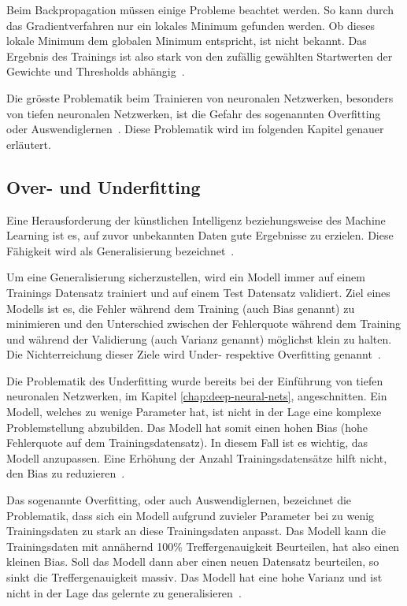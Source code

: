 Beim Backpropagation müssen einige Probleme beachtet werden. So kann durch das Gradientverfahren nur ein lokales Minimum gefunden werden. Ob dieses lokale Minimum dem globalen Minimum entspricht, ist nicht bekannt. Das Ergebnis des Trainings ist also stark von den zufällig gewählten Startwerten der Gewichte und Thresholds abhängig~\autocite{Krogh2008}.

Die grösste Problematik beim Trainieren von neuronalen Netzwerken, besonders von tiefen neuronalen Netzwerken, ist die Gefahr des sogenannten Overfitting oder Auswendiglernen~\autocite{Krogh2008}. Diese Problematik wird im folgenden Kapitel genauer erläutert.

\subsection{Over- und Underfitting}
\label{chap:overfitting}

Eine Herausforderung der künstlichen Intelligenz beziehungsweise des Machine Learning ist es, auf zuvor unbekannten Daten gute Ergebnisse zu erzielen. Diese Fähigkeit wird als Generalisierung bezeichnet~\autocite{Goodfellow2016}.

Um eine Generalisierung sicherzustellen, wird ein Modell immer auf einem Trainings Datensatz trainiert und auf einem Test Datensatz validiert. Ziel eines Modells ist es, die Fehler während dem Training (auch Bias genannt) zu minimieren und den Unterschied zwischen der Fehlerquote während dem Training und während der Validierung (auch Varianz genannt) möglichst klein zu halten. Die Nichterreichung dieser Ziele wird Under- respektive Overfitting genannt~\autocite{Goodfellow2016}.

Die Problematik des Underfitting wurde bereits bei der Einführung von tiefen neuronalen Netzwerken, im Kapitel \ref{chap:deep-neural-nets}, angeschnitten. Ein Modell, welches zu wenige Parameter hat, ist nicht in der Lage eine komplexe Problemstellung abzubilden. Das Modell hat somit einen hohen Bias (hohe Fehlerquote auf dem Trainingsdatensatz). In diesem Fall ist es wichtig, das Modell anzupassen. Eine Erhöhung der Anzahl Trainingsdatensätze hilft nicht, den Bias zu reduzieren~\autocite{MLYearning}.

Das sogenannte Overfitting, oder auch Auswendiglernen, bezeichnet die Problematik, dass sich ein Modell aufgrund zuvieler Parameter bei zu wenig Trainingsdaten zu stark an diese Trainingsdaten anpasst. Das Modell kann die Trainingsdaten mit annähernd 100\% Treffergenauigkeit Beurteilen, hat also einen kleinen Bias. Soll das Modell dann aber einen neuen Datensatz beurteilen, so sinkt die Treffergenauigkeit massiv. Das Modell hat eine hohe Varianz und ist nicht in der Lage das gelernte zu generalisieren~\autocite{MLYearning, Krogh2008}.

